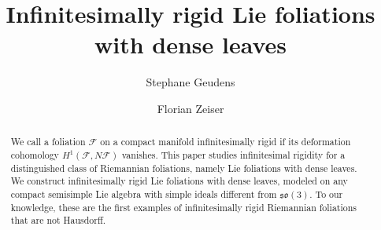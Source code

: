 \documentclass[11pt, letterpaper, oneside,reqno]{amsart}
\theoremstyle{plain}
\theoremstyle{underline}
\theoremstyle{definition}
\theoremstyle{remark}
\begin{document}
	
	\title{Infinitesimally rigid Lie foliations with dense leaves}
	
	\author{Stephane Geudens}
	\address{{\scriptsize Institute of Mathematics, Polish Academy of Sciences,  ul. Sniadeckich 8, 00-656 Warsaw, Poland}}
	
	\author{Florian Zeiser}
	\address{{\scriptsize Center for Geometry and Physics, Institute for Basic Science, 79 Jigok-ro 127beon-gil, Nam-gu, Pohang-si, Gyeongsangbuk-do, Republic of Korea 37673}}
	
	
	\begin{abstract}
		We call a foliation $\mathcal{F}$ on a compact manifold infinitesimally rigid if its deformation cohomology $H^{1}(\mathcal{F},N\mathcal{F})$ vanishes. This paper studies infinitesimal rigidity for a distinguished class of Riemannian foliations, namely Lie foliations with dense leaves. We construct infinitesimally rigid Lie foliations with dense leaves, modeled on any compact semisimple Lie algebra with simple ideals different from $\mathfrak{so}(3)$. To our knowledge, these are the first examples of infinitesimally rigid Riemannian foliations that are not Hausdorff.
	\end{abstract}
	
	\maketitle
	
	\setcounter{tocdepth}{1} %
	\tableofcontents
	
\end{document}
